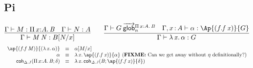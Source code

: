 









\subsection{Pi}

\begin{small}
  \[
  \infer{\ofglob{\Gamma}{\app{M}{N}}{\subst{B}{N}{x}}}
  {\ofglob{\Gamma}{M}{\picl{x}{A}{B}} & \ofglob{\Gamma}{N}{A}} \qquad
  \infer{\ofglob{\Gamma}{\ulam{x}{\alpha}}{G}}
  {\wfglob{\Gamma}{G}{\picl{x}{A}{B}}n &
    \ofglob{\Gamma,\tptm{x}{A}}{\alpha}{\Ap{(f.\app{f}{x})}{G}}}
  \]
\[
  \begin{array}{rcl}
  \ap{(f.\app f M)}{(\ulam{x}{\alpha})} & \equiv & \tsubst{\alpha}{M/x} \\

\alpha & \equiv & \ulam{x}{\ap{(f.\app f x)}{\alpha}} \text{ (\FIXME{Can we get away without $\eta$ definitionally?})} \\

\coh{\Delta.J}{\picl{x}{A}{B}}{\delta} & \equiv & \ulam{x}{\coh{\Delta.J}{B}{\ap{(f.\app f x)}{\delta}}} \\
 
\end{array}
\]
\end{small}


